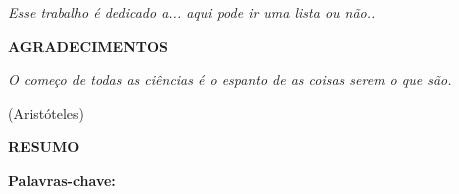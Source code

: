 
\newpage 
\vspace*{206mm}

\begin{flushright}
\begin{minipage}[!b]{8cm}
\emph{Esse trabalho é dedicado a... aqui pode ir uma lista ou não..}
\end{minipage}
\end{flushright}

\clearpage
\newpage 



\begin{center} 
\textbf{AGRADECIMENTOS}
\end{center}
\vskip 1.0cm

\lipsum[1-3] %





\newpage%

\vspace*{180mm}

\begin{flushright}
\begin{minipage}[!b]{10cm}
\emph{O começo de todas as ciências é o espanto de as coisas serem o que são.}
\vspace{5mm}


\hfill (Aristóteles)


\end{minipage}
\end{flushright}


\clearpage %

\newpage


\vskip 1.0cm

\begin{center} 
\textbf{RESUMO}
\end{center}
\vskip 0.5cm

\begin{noindent}

\lipsum[3-4]

\vskip 10mm

\noindent \textbf{Palavras-chave:}  

\end{noindent} 

